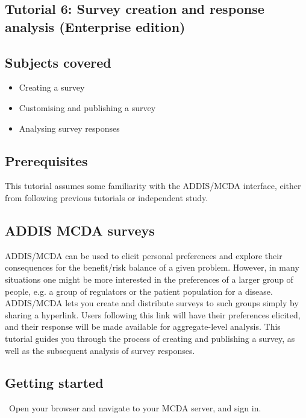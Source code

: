 \documentclass[00_mcda_tutorial.tex]{subfiles}
\begin{document}
\begin{sidebar*}

\section*{Tutorial 6: Survey creation and response analysis (Enterprise edition)}
\addtocounter{section}{1}

\subsection*{Subjects covered}
\begin{itemize}
  \item Creating a survey
  \item Customising and publishing a survey
  \item Analysing survey responses
\end{itemize}

\subsection*{Prerequisites}
\noindent This tutorial assumes some familiarity with the ADDIS/MCDA interface, either from following previous tutorials or independent study.

\subsection*{ADDIS MCDA surveys}
\noindent ADDIS/MCDA can be used to elicit personal preferences and explore their consequences for the benefit/risk balance of a given problem.
However, in many situations one might be more interested in the preferences of a larger group of people, e.g. a group of regulators or the patient population for a disease.
ADDIS/MCDA lets you create and distribute surveys to such groups simply by sharing a hyperlink.
Users following this link will have their preferences elicited, and their response will be made available for aggregate-level analysis.
This tutorial guides you through the process of creating and publishing a survey, as well as the subsequent analysis of survey responses.

\subsection*{Getting started}
\noindent \leftpointright \, Open your browser and navigate to your MCDA server, and sign in.
\newline


\end{sidebar*}
\end{document}
